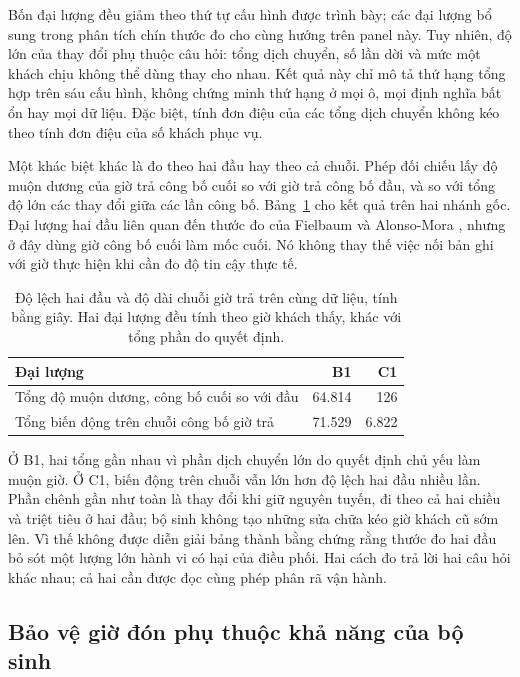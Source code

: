 Bốn đại lượng đều giảm theo thứ tự cấu hình được trình bày; các đại lượng bổ sung trong
phân tích chín thước đo cho cùng hướng trên panel này. Tuy nhiên, độ lớn của thay đổi phụ
thuộc câu hỏi: tổng dịch chuyển, số lần dời và mức một khách chịu không thể dùng thay cho
nhau. Kết quả này chỉ mô tả thứ hạng tổng hợp trên sáu cấu hình, không chứng minh thứ hạng
ở mọi ô, mọi định nghĩa bất ổn hay mọi dữ liệu. Đặc biệt, tính đơn điệu của các tổng dịch
chuyển không kéo theo tính đơn điệu của số khách phục vụ.

Một khác biệt khác là đo theo hai đầu hay theo cả chuỗi. Phép đối chiếu lấy độ muộn dương
của giờ trả công bố cuối so với giờ trả công bố đầu, và so với tổng độ lớn các thay đổi
giữa các lần công bố. Bảng~\ref{bang:kiemtra-hai-dau} cho kết quả trên hai nhánh gốc.
Đại lượng hai đầu liên quan đến thước đo của Fielbaum và Alonso-Mora
\cite{fielbaum2020}, nhưng ở đây dùng giờ công bố cuối làm mốc cuối. Nó không thay thế
việc nối bản ghi với giờ thực hiện khi cần đo độ tin cậy thực tế.

\begin{table}[htbp]
\centering
\caption{Độ lệch hai đầu và độ dài chuỗi giờ trả trên cùng dữ liệu, tính bằng giây.
Hai đại lượng đều tính theo giờ khách thấy, khác với tổng phần do quyết định.}
\label{bang:kiemtra-hai-dau}
\small
\begin{tabular}{@{}lrr@{}}
\toprule
\textbf{Đại lượng} & \textbf{B1} & \textbf{C1}\\
\midrule
Tổng độ muộn dương, công bố cuối so với đầu & 64.814 & 126\\
Tổng biến động trên chuỗi công bố giờ trả & 71.529 & 6.822\\
\bottomrule
\end{tabular}
\end{table}

Ở B1, hai tổng gần nhau vì phần dịch chuyển lớn do quyết định chủ yếu làm muộn giờ.
Ở C1, biến động trên chuỗi vẫn lớn hơn độ lệch hai đầu nhiều lần. Phần chênh gần như
toàn là thay đổi khi giữ nguyên tuyến, đi theo cả hai chiều và triệt tiêu ở hai đầu;
bộ sinh không tạo những sửa chữa kéo giờ khách cũ sớm lên. Vì thế không được diễn giải
bảng thành bằng chứng rằng thước đo hai đầu bỏ sót một lượng lớn hành vi có hại của
điều phối. Hai cách đo trả lời hai câu hỏi khác nhau; cả hai cần được đọc cùng phép
phân rã vận hành.

\subsection{Bảo vệ giờ đón phụ thuộc khả năng của bộ sinh}


